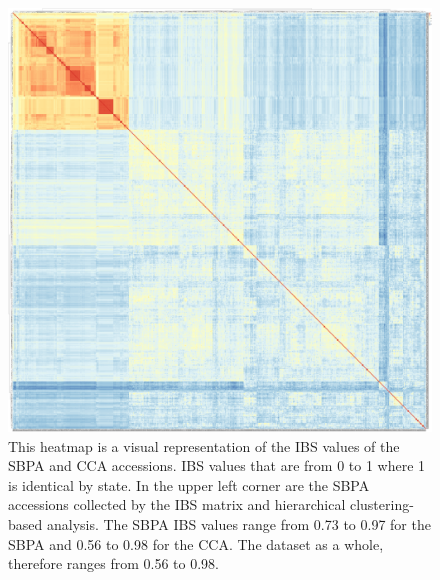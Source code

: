\documentclass[9pt, twocolumn,twoside]{gsajnl}
\begin{document}
\begin{figure}[p]
\centering
\includegraphics[width=\linewidth]{heat1.pdf}
\caption{This heatmap is a visual representation of the IBS values of the SBPA and CCA accessions. IBS values that are from 0 to 1 where 1 is identical by state. In the upper left corner are the SBPA accessions collected by the IBS matrix and hierarchical clustering-based analysis. The SBPA IBS values range from 0.73 to 0.97 for the SBPA and 0.56 to 0.98 for the CCA. The dataset as a whole, therefore ranges from 0.56 to 0.98.  }
\label{fig:heatall}
\end{figure}
\end{document}
